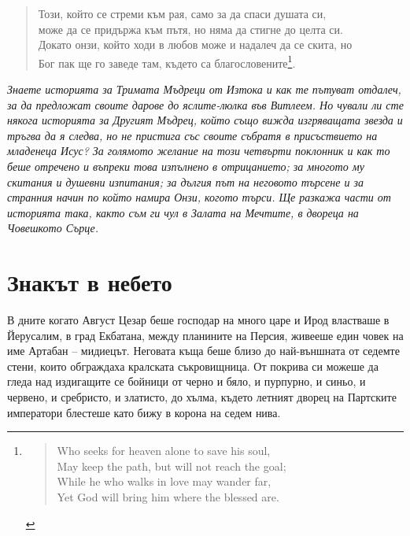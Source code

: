 \thispagestyle{plain}

\begin{quote}
  \fontsize{8}{10}\selectfont
  \begin{obeylines}
    \setlength{\parskip}{.1em}
    Този, който се стреми към рая, само за да спаси душата си,
    може да се придържа към пътя, но няма да стигне до целта си.
    Докато онзи, който ходи в любов може и надалеч да се скита, но
    Бог пак ще го заведе там, където са благословените\footnote{
    \vspace{-0.55cm}
    \begin{quote}
      \setlength{\leftskip}{-0.25cm}
      \begin{otherlanguage}{english}
        Who seeks for heaven alone to save his soul,
        May keep the path, but will not reach the goal;
        While he who walks in love may wander far,
        Yet God will bring him where the blessed are.
      \end{otherlanguage}
    \end{quote}
    }.
  \end{obeylines}
\end{quote}

\vspace{2cm}

\emph{Знаете историята за Тримата Мъдреци от Изтока и как те пътуват отдалеч, за
да предложат своите дарове до яслите-люлка във Витлеем. Но чували ли сте някога
историята за Другият Мъдрец, който също вижда изгряващата звезда и тръгва да я
следва, но не пристига със своите събратя в присъствието на младенеца Исус? За
голямото желание на този четвърти поклонник и как то беше отречено и въпреки
това изпълнено в отрицанието; за многото му скитания и душевни изпитания; за
дългия път на неговото търсене и за странния начин по който намира Онзи, когото
търси. Ще разкажа части от историята така, както съм ги чул в Залата на Мечтите,
в двореца на Човешкото Сърце.}

\newpage

\part{Знакът в небето}

В дните когато Август Цезар беше господар на много царе и Ирод властваше в
Йерусалим, в град Екбатана, между планините на Персия, живееше един човек на име
Артабан -- мидиецът. Неговата къща беше близо до най-външната от седемте стени,
които обграждаха кралската съкровищница. От покрива си можеше да гледа над
издигащите се бойници от черно и бяло, и пурпурно, и синьо, и червено, и
сребристо, и златисто, до хълма, където летният дворец на Партските императори
блестеше като бижу в корона на седем нива.


